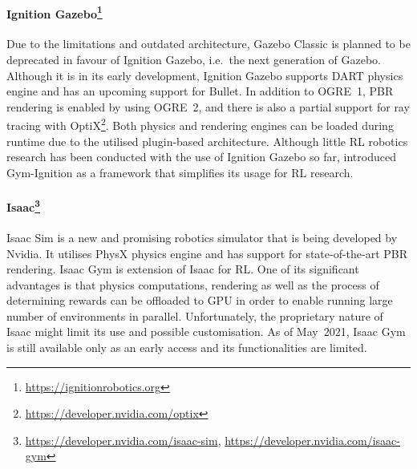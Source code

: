 \paragraph{Ignition Gazebo\protect\footnote{\href{https://ignitionrobotics.org}{https://ignitionrobotics.org}}} Due to the limitations and outdated architecture, Gazebo Classic is planned to be deprecated in favour of Ignition Gazebo, i.e.~the next generation of Gazebo. Although it is in its early development, Ignition Gazebo supports DART physics engine and has an upcoming support for Bullet. In addition to OGRE~1, PBR rendering is enabled by using OGRE~2, and there is also a partial support for ray tracing with OptiX\footnote{\href{https://developer.nvidia.com/optix}{https://developer.nvidia.com/optix}}. Both physics and rendering engines can be loaded during runtime due to the utilised plugin-based architecture. Although little RL robotics research has been conducted with the use of Ignition Gazebo so far, \citet{ferigo_gym-ignition_2020} introduced Gym-Ignition as a framework that simplifies its usage for RL research.

\paragraph{Isaac\protect\footnote{\href{https://developer.nvidia.com/isaac-sim}{https://developer.nvidia.com/isaac-sim}, \href{https://developer.nvidia.com/isaac-gym}{https://developer.nvidia.com/isaac-gym}}} Isaac Sim is a new and promising robotics simulator that is being developed by Nvidia. It utilises PhysX physics engine and has support for state-of-the-art PBR rendering. Isaac Gym is extension of Isaac for RL. One of its significant advantages is that physics computations, rendering as well as the process of determining rewards can be offloaded to GPU in order to enable running large number of environments in parallel. Unfortunately, the proprietary nature of Isaac might limit its use and possible customisation. As of May~2021, Isaac Gym is still available only as an early access and its functionalities are limited.

\bigskip

